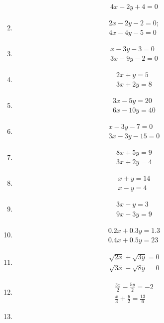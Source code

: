 \begin{enumerate}[label=\thesubsection.\arabic*,ref=\thesubsection.\theenumi]
\begin{align}
 	4x-2y+4=0
	\end{align}
\item \begin{align}
	2x-2y-2=0;\\
	4x-4y-5=0
	\end{align}
	\item \begin{align}
	x-3y-3=0\\
	3x-9y-2=0
        \end{align}
       \item \begin{align}
	2x+y=5\\
	3x+2y=8
	\end{align}
	\item \begin{align}
	3x-5y=20\\
	6x-10y=40
	\end{align}
	\item \begin{align}
	x-3y-7=0\\
	3x-3y-15=0
        \end{align}
\item \begin{align}
8x+5y=9
\\ 3x+2y=4
\end{align}
	\item
	\begin{align}
   	 x+y=14 \\x-y=4
	\end{align}
	\item
	\begin{align}
    	3x-y=3\\ 9x-3y=9
	\end{align}
\item 	\begin{align}   	
 	0.2x+0.3y=1.3\\ 0.4x+0.5y=23
	\end{align}
	\item     
	\begin{align}
	\sqrt{2x}+\sqrt{3y}=0\\ \sqrt{3x}-\sqrt{8y}=0
	\end{align}
	\item
	\begin{align}
    	\frac{3x}{2}-\frac{5y}{2}=-2\\ \frac{x}{3}+\frac{y}{2}=\frac{13}{6}
    	\end{align}
\item

\end{enumerate}
